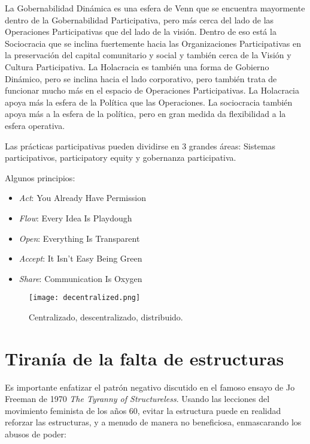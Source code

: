 La Gobernabilidad Dinámica es una esfera de Venn que se encuentra mayormente dentro de la Gobernabilidad Participativa, pero más cerca del lado de las Operaciones Participativas que del lado de la visión. Dentro de eso está la Sociocracia que se inclina fuertemente hacia las Organizaciones Participativas en la preservación del capital comunitario y social y también cerca de la Visión y Cultura Participativa. La Holacracia es también una forma de Gobierno Dinámico, pero se inclina hacia el lado corporativo, pero también trata de funcionar mucho más en el espacio de Operaciones Participativas. La Holacracia apoya más la esfera de la Política que las Operaciones. La sociocracia también apoya más a la esfera de la política, pero en gran medida da flexibilidad a la esfera operativa.

Las prácticas participativas pueden dividirse en 3 grandes áreas: Sistemas participativos, participatory equity y gobernanza participativa.

Algunos principios:

\begin{itemize}
\item \emph{Act}: You Already Have Permission
\item \emph{Flow}: Every Idea Is Playdough
\item \emph{Open}: Everything Is Transparent
\item \emph{Accept}: It Isn't Easy Being Green
\item \emph{Share}: Communication Is Oxygen
\end{itemize}

\begin{figure}[htbp]
	\centering
	\texttt{[image: decentralized.png]}
	\caption{Centralizado, descentralizado, distribuido.}
	\label{fig:descentralizado}
\end{figure}

\section{Tiranía de la falta de estructuras}
\label{sec:tirania}

Es importante enfatizar el patrón negativo discutido en el famoso ensayo de Jo Freeman de 1970 \emph{The Tyranny of Structureless}. Usando las lecciones del movimiento feminista de los años 60, evitar la estructura puede en realidad reforzar las estructuras, y a menudo de manera no beneficiosa, enmascarando los abusos de poder:

